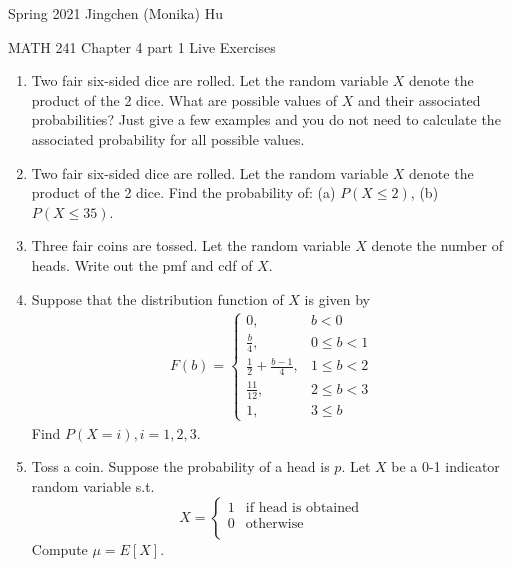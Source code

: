 \documentclass[11pt]{article}
\begin{document}
\enlargethispage{\baselineskip}

Spring 2021 \hfill Jingchen (Monika) Hu\\

\begin{center}
{\huge MATH 241 Chapter 4 part 1 Live Exercises}	\\
\end{center}
\vspace{0.5cm}

\begin{enumerate}


\item Two fair six-sided dice are rolled. Let the random variable $X$ denote the product of the 2 dice. What are possible values of $X$ and their associated probabilities? Just give a few examples and you do not need to calculate the associated probability for all possible values.

\item Two fair six-sided dice are rolled. Let the random variable $X$ denote the product of the 2 dice. Find the probability of: (a) $P(X \leq 2)$, (b) $P(X \leq 35)$.

\item Three fair coins are tossed. Let the random variable $X$ denote the number of heads. Write out the pmf and cdf of $X$.

\item Suppose that the distribution function of $X$ is given by
\begin{align*}
F(b)= 
\begin{cases}
    0,& b < 0\\
    \frac{b}{4},& 0 \leq b < 1 \\
    \frac{1}{2} + \frac{b - 1}{4},& 1 \leq b < 2 \\
    \frac{11}{12}, & 2 \leq b < 3 \\
    1, & 3 \leq b
\end{cases}
\end{align*}
Find $P(X = i), i = 1, 2, 3$.

\item Toss a coin. Suppose the probability of a head is $p$. Let $X$ be
a 0-1 indicator random variable s.t.\
\[
X = \left\{
\begin{array}{ll}
1	& \text{if head is obtained}\\
0	& \text{otherwise}\\
\end{array}
\right.
\]
Compute $\mu = E[X]$.


\end{enumerate}
\end{document}
